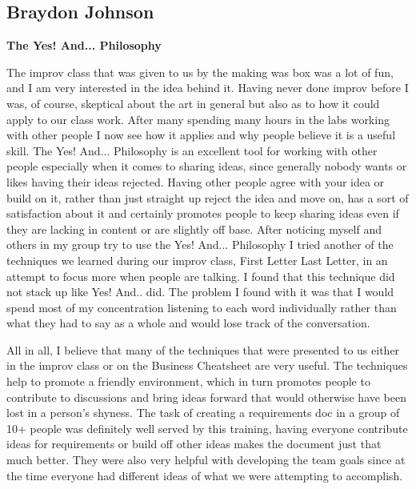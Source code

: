 \documentclass[12pt,letterpaper]{article}
\begin{document}
\subsection{Braydon Johnson}
\textbf{The Yes! And... Philosophy}\par
The improv class that was given to us by the making was box was a lot of fun, and I am very interested in the idea behind it. Having never done improv before I was, of course, skeptical about the art in general but also as to how it could apply to our class work. After many spending many hours in the labs working with other people I now see how it applies and why people believe it is a useful skill. The Yes! And... Philosophy is an excellent tool for working with other people especially when it comes to sharing ideas, since generally nobody wants or likes having their ideas rejected. Having other people agree with your idea or build on it, rather than just straight up reject the idea and move on, has a sort of satisfaction about it and certainly promotes people to keep sharing ideas even if they are lacking in content or are slightly off base. After noticing myself and others in my group try to use the Yes! And... Philosophy I tried another of the techniques we learned during our improv class, First Letter Last Letter, in an attempt to focus more when people are talking. I found that this technique did not stack up like Yes! And.. did. The problem I found with it was that I would spend most of my concentration listening to each word individually rather than what they had to say as a whole and would lose track of the conversation.\par
	All in all, I believe that many of the techniques that were presented to us either in the improv class or on the Business Cheatsheet are very useful. The techniques help to promote a friendly environment, which in turn promotes people to contribute to discussions and bring ideas forward that would otherwise have been lost in a person’s shyness. The task of creating a requirements doc in a group of 10+ people was definitely well served by this training, having everyone contribute ideas for requirements or build off other ideas makes the document just that much better. They were also very helpful with developing the team goals since at the time everyone had different ideas of what we were attempting to accomplish.

\clearpage
\end{document}
